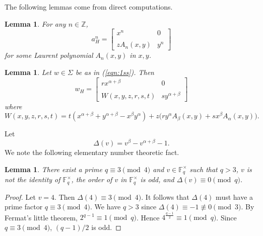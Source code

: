 \documentclass[11pt]{amsart}
\newtheorem{lemma}[theorem]{Lemma}
\theoremstyle{definition}
\theoremstyle{definition}
\numberwithin{equation}{section}
\begin{document}
The following lemmas come from direct computations.

\begin{lemma}\label{lem:anH} For any $n\in\mathbb{Z}$, 
$$ a_H^n=\left[\begin{array}{cc} x^n & 0 \\ \\ zA_n(x,y) & y^n\end{array}\right] $$
for some Laurent polynomial $A_n(x,y)$ in $x, y$.
\end{lemma}




\begin{lemma}\label{lem:wH} Let $w\in \Sigma$ be as in (\ref{eqn:1ss}). Then
$$ w_H=\left[\begin{array}{cc} rx^{\alpha+\beta} & 0 \\ \\ W(x,y,z,r,s,t) & sy^{\alpha+\beta} \end{array}\right] $$
where
$$ W(x,y,z,r,s,t)= t(x^{\alpha+\beta}+y^{\alpha+\beta}-x^\beta y^{\alpha})+z\big(ry^\alpha A_\beta(x,y)+sx^\beta A_\alpha(x,y)\big). $$
\end{lemma}

Let
\begin{equation} \Delta(v)=v^{\beta}-v^{\alpha+\beta}-1. \end{equation}
We note the following elementary number theoretic fact.

\begin{lemma}\label{lem:4q} There exist a prime $q\equiv 3\pmod 4$ and $v\in \mathbb{F}_q^\times$ such that $q>3$, $v$ is not the identity of $\mathbb{F}_q^\times$, the order of $v$ in $\mathbb{F}_q^\times$ is odd, and $\Delta(v)\equiv 0\pmod q$.
\end{lemma}

\begin{proof} Let $v=4$. Then $\Delta(4)\equiv 3\pmod 4$. It follows that  $\Delta(4)$ must have a prime factor $q\equiv 3\pmod 4$. We have $q>3$ since $\Delta(4)\equiv -1\not\equiv 0\pmod 3$. By Fermat's little theorem, $2^{q-1}\equiv 1\pmod q$. Hence $4^{\frac{q-1}{2}}\equiv 1\pmod q$. Since $q\equiv 3\pmod 4$, $(q-1)/2$ is odd. 
\end{proof}
\end{document}

